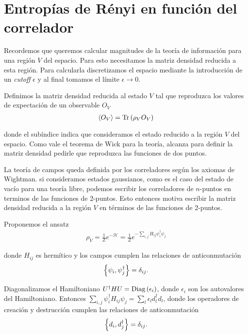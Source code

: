 \documentclass[../main.tex]{subfiles}
\begin{document}
\section{Entropías de Rényi en función del correlador}

Recordemos que queremos calcular magnitudes de la teoría de información para una región $V$ del espacio. Para esto necesitamos la matriz densidad reducida a esta región. Para calcularla discretizamos el espacio mediante la introducción de un \textit{cutoff} $\epsilon$ y al final tomamos el límite $\epsilon \to 0$.

Definimos la matriz densidad reducida al estado $V$ tal que reproduzca los valores de expectación de un observable $O_V$
\begin{align}
	\langle O_V \rangle = \text{Tr}\left ( \rho_V O_V \right )
\end{align}

\noindent donde el subíndice indica que consideramos el estado reducido a la región $V$ del espacio. Como vale el teorema de Wick para la teoría, alcanza para definir la matriz densidad pedirle que reproduzca las funciones de dos puntos.

La teoría de campos queda definida por los correladores según los axiomas de Wightman. si consideramos estados gaussianos, como es el caso del estado de vacío para una teoría libre, podemos escribir los correladores de $n$-puntos en terminos de las funciones de 2-puntos. Esto entonces motiva escribir la matriz densidad reducida a la región $V$ en términos de las funciones de 2-puntos.

Proponemos el ansatz
\begin{align}
	\rho_V = \frac 1Z e^{-\mathcal H} = \frac 1Z e^{-\sum_{i, j} H_{i j} \psi_i^\dagger \psi_j}
\end{align}

\noindent donde $H_{ij}$ es hermítico y los campos cumplen las relaciones de anticonmutación
\begin{align}
	\left \{ \psi_i, \psi_j^\dagger \right \} = \delta_{ij}.
\end{align}

Diagonalizamos el Hamiltoniano $U^\dagger H U = \text{Diag}\left ( \epsilon_i \right )$, donde $\epsilon_i$ son los autovalores del Hamiltoniano. Entonces $\sum_{i, j} \psi_i^\dagger H_{i j} \psi_j = \sum_l \epsilon_l d_l^\dagger d_l$, donde los operadores de creación y destrucción cumplen las relaciones de anticonmutación
\begin{align}
	\label{eq:ch3:creat_annihi_acomm}
	\left \{ d_i, d_j^\dagger \right \} = \delta_{i j}.
\end{align}
\end{document}

